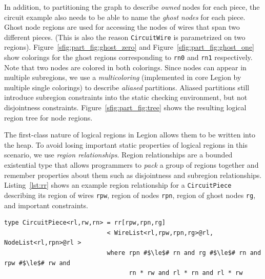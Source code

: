 In addition, to partitioning the graph to describe {\em owned} nodes
for each piece, the circuit example also
needs to be able to name the {\em ghost nodes} for each piece.  Ghost node
regions are used for accessing the nodes of wires that span
two different pieces. (This is also the reason {\tt CircuitWire} is parametrized on
two regions).  Figure~\ref{sfig:part_fig:ghost_zero} and 
Figure~\ref{sfig:part_fig:ghost_one} show colorings for the ghost regions
corresponding to {\tt rn0} and {\tt rn1} respectively.  Note that two 
nodes are colored in both colorings.  Since nodes can appear in multiple
subregions, we use a {\em multicoloring} (implemented in core Legion
by multiple single colorings) to describe {\em aliased} partitions.  Aliased
partitions still introduce subregion constraints into the static checking
environment, but not disjointness constraints.  Figure~\ref{sfig:part_fig:tree}
shows the resulting logical region tree for node regions.

The first-class nature of logical regions in Legion allows them to
be written into the heap.  To avoid losing important static properties of
logical regions in this scenario, we use {\em region
relationships}.  Region relationships are a bounded existential type
that allows programmers to {\em pack} a group of regions together and remember
properties about them such as disjointness and subregion relationships.
Listing~\ref{lst:rr} shows an example region relationship for a {\tt CircuitPiece} 
describing its region of wires {\tt rpw}, region of 
nodes {\tt rpn}, region of ghost nodes {\tt rg}, and important constraints.

\begin{lstlisting}[label={lst:rr},caption={Region Relationship Example}]
type CircuitPiece<rl,rw,rn> = rr[rpw,rpn,rg]
                            < WireList<rl,rpw,rpn,rg>@rl, NodeList<rl,rpn>@rl >         
                            where rpn #$\le$# rn and rg #$\le$# rn and rpw #$\le$# rw and
                                  rn * rw and rl * rn and rl * rw
\end{lstlisting}

